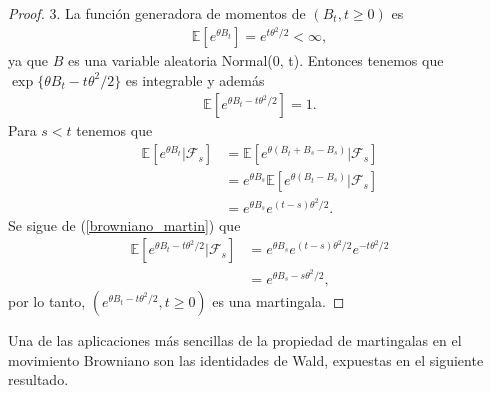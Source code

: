 \begin{proof}
3. La función generadora de momentos de $(B_t, t \geq 0)$ es
\begin{align}
\mathbb{E} \left[ e^{\theta B_t} \right] = e^{t \theta^2 / 2} < \infty, \label{asdfghjk}
\end{align}
ya que $B$ es una variable aleatoria Normal(0, t).  Entonces tenemos que $\exp \{ \theta B_t - t \theta^2 / 2 \}$ es integrable y además
\begin{align*}
\mathbb{E} \left[ e^{\theta B_t - t \theta^2 / 2} \right] = 1.
\end{align*}
Para $s < t$ tenemos que
\begin{align}
\mathbb{E} \left[ e^{\theta B_t} \big| \mathcal{F}_s \right] & = \mathbb{E} \left[ e^{\theta ( B_t + B_s - B_s ) } \big| \mathcal{F}_s \right] \nonumber \\
& = e^{\theta B_s  } \mathbb{E} \left[ e^{\theta ( B_t - B_s ) } \big| \mathcal{F}_s \right] \nonumber \\
& = e^{ \theta B_s } e^{ (t-s) \theta^2 / 2 }. \label{browniano_martin}
\end{align}
Se sigue de (\ref{browniano_martin}) que 
\begin{align*}
\mathbb{E} \left[ e^{\theta B_t - t \theta^2 / 2} \big| \mathcal{F}_s \right] & = e^{ \theta B_s } e^{ (t-s) \theta^2 / 2 } e^{ -t \theta^2 / 2 } \\
& = e^{ \theta B_s -s \theta^2 / 2 },
\end{align*}
por lo tanto, $(e^{ \theta B_t - t \theta^2 / 2 }, t \geq 0)$ es una martingala.
\end{proof}
 
Una de las aplicaciones más sencillas de la propiedad de martingalas en el movimiento Browniano son las identidades de Wald, expuestas en el siguiente resultado.

